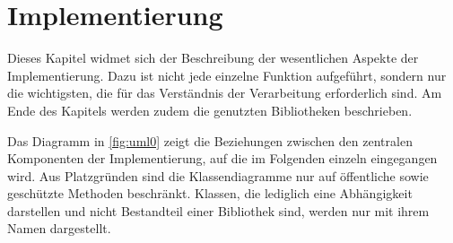 \chapter{Implementierung}
Dieses Kapitel widmet sich der Beschreibung der wesentlichen Aspekte der Implementierung.
Dazu ist nicht jede einzelne Funktion aufgeführt, sondern nur die wichtigsten, die für das Verständnis der Verarbeitung erforderlich sind.
Am Ende des Kapitels werden zudem die genutzten Bibliotheken beschrieben.

Das Diagramm in \autoref{fig:uml0} zeigt die Beziehungen zwischen den zentralen Komponenten der Implementierung, auf die im Folgenden einzeln eingegangen wird.
Aus Platzgründen sind die Klassendiagramme nur auf öffentliche sowie geschützte Methoden beschränkt.
Klassen, die lediglich eine Abhängigkeit darstellen und nicht Bestandteil einer Bibliothek sind, werden nur mit ihrem Namen dargestellt.














